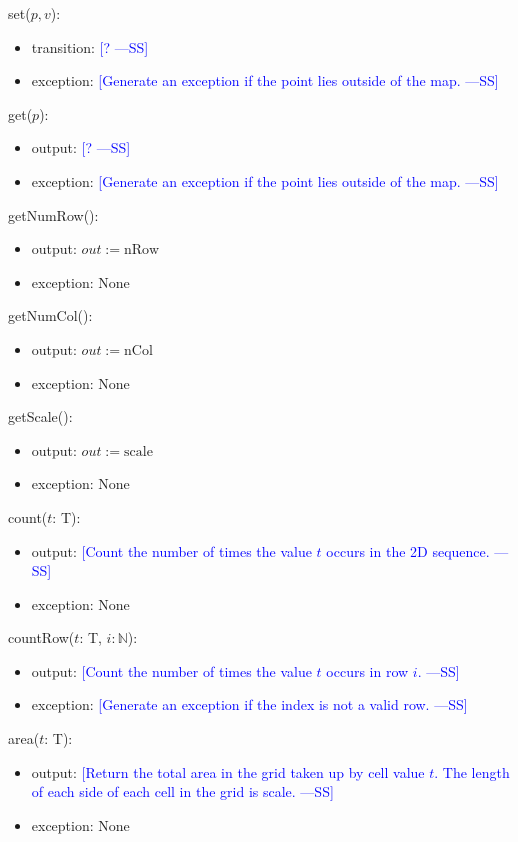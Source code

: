 \documentclass[12pt]{article}
\newcommand{\authornote}[3]{\textcolor{#1}{[#3 ---#2]}}
\newcommand{\authornote}[3]{}
\newcommand{\wss}[1]{\authornote{blue}{SS}{#1}}
\begin{document}
\noindent set($p, v$):
\begin{itemize}
\item transition: \wss{?}
\item exception: \wss{Generate an exception if the point lies outside of the
    map.}
\end{itemize}

\noindent get($p$):
\begin{itemize}
\item output: \wss{?}
\item exception: \wss{Generate an exception if the point lies outside of the
    map.}
\end{itemize}

\noindent getNumRow():
\begin{itemize}
\item output: $out := \mbox{nRow}$
\item exception: None
\end{itemize}

\noindent getNumCol():
\begin{itemize}
\item output: $out := \mbox{nCol}$
\item exception: None
\end{itemize}

\noindent getScale():
\begin{itemize}
\item output: $out := \mbox{scale}$
\item exception: None
\end{itemize}

\noindent count($t$: T):
\begin{itemize}
\item output: \wss{Count the number of times the value $t$ occurs in the 2D
    sequence.}
\item exception: None
\end{itemize}

\noindent countRow($t$: T, $i: \mathbb{N}$):
\begin{itemize}
\item output: \wss{Count the number of times the value $t$ occurs in row
    $i$.}
\item exception: \wss{Generate an exception if the index is not a valid
    row.}
\end{itemize}

\noindent area($t$: T):
\begin{itemize}
\item output: \wss{Return the total area in the grid taken up by cell value $t$.
    The length of each side of each cell in the grid is
    scale.}
\item exception: None
\end{itemize}
\end{document}
